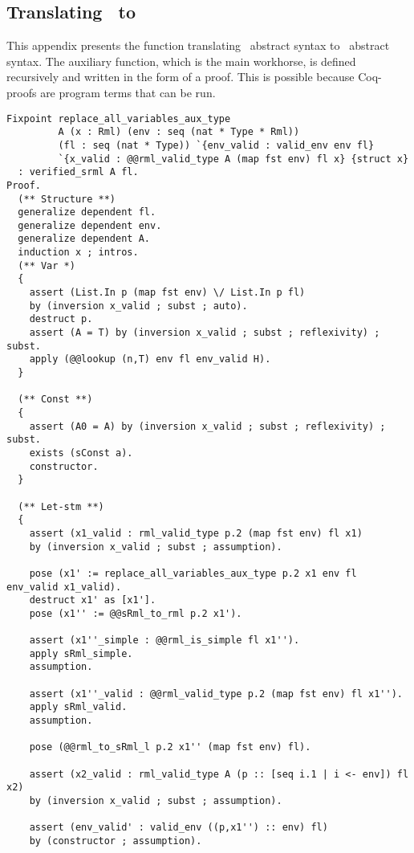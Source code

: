 \documentclass[11pt, leqno, titlepage]{article}
\theoremstyle{definition}
\begin{document}
\newpage
\begin{appendices}

  \section{Translating \rmlx\ to \srml}
  \label{app:rml-to-srml}
  This appendix presents the function translating \rmlx\ abstract syntax to \srml\
  abstract syntax. The auxiliary function, which is the main workhorse, is defined
  recursively and written in the form of a proof. This is possible because Coq-proofs
  are program terms that can be run. 
\begin{lstlisting}[language=coq]
Fixpoint replace_all_variables_aux_type
         A (x : Rml) (env : seq (nat * Type * Rml))
         (fl : seq (nat * Type)) `{env_valid : valid_env env fl}
         `{x_valid : @@rml_valid_type A (map fst env) fl x} {struct x}
  : verified_srml A fl.
Proof.
  (** Structure **)
  generalize dependent fl.
  generalize dependent env.
  generalize dependent A.
  induction x ; intros.
  (** Var *)
  {
    assert (List.In p (map fst env) \/ List.In p fl) 
    by (inversion x_valid ; subst ; auto).
    destruct p.
    assert (A = T) by (inversion x_valid ; subst ; reflexivity) ; subst.
    apply (@@lookup (n,T) env fl env_valid H).
  }

  (** Const **)
  {
    assert (A0 = A) by (inversion x_valid ; subst ; reflexivity) ; subst.
    exists (sConst a).
    constructor.
  }
      
  (** Let-stm **)
  {
    assert (x1_valid : rml_valid_type p.2 (map fst env) fl x1) 
    by (inversion x_valid ; subst ; assumption).

    pose (x1' := replace_all_variables_aux_type p.2 x1 env fl env_valid x1_valid).
    destruct x1' as [x1'].
    pose (x1'' := @@sRml_to_rml p.2 x1').

    assert (x1''_simple : @@rml_is_simple fl x1'').
    apply sRml_simple.
    assumption.

    assert (x1''_valid : @@rml_valid_type p.2 (map fst env) fl x1'').
    apply sRml_valid.
    assumption.
    
    pose (@@rml_to_sRml_l p.2 x1'' (map fst env) fl).
        
    assert (x2_valid : rml_valid_type A (p :: [seq i.1 | i <- env]) fl x2) 
    by (inversion x_valid ; subst ; assumption).

    assert (env_valid' : valid_env ((p,x1'') :: env) fl) 
    by (constructor ; assumption).
    

\end{lstlisting}
\end{appendices}
\end{document}
